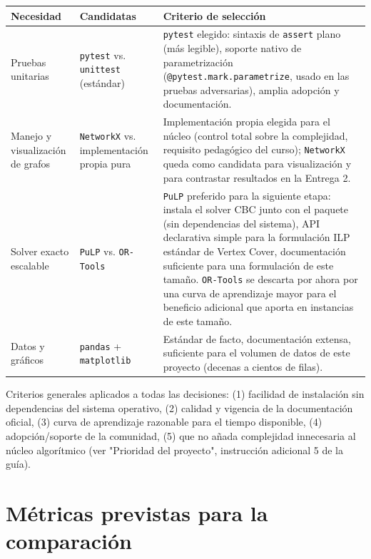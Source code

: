\documentclass[11pt,a4paper]{article}
\begin{document}
\begin{center}
\begin{tabular}{p{2.9cm}p{4.8cm}p{6.5cm}}
	\toprule
	\textbf{Necesidad} & \textbf{Candidatas} & \textbf{Criterio de selección} \\
	\midrule
	Pruebas unitarias &
		\texttt{pytest} vs. \texttt{unittest} (estándar) &
		\texttt{pytest} elegido: sintaxis de \texttt{assert} plano (más legible), soporte
		nativo de parametrización (\texttt{@pytest.mark.parametrize}, usado en las pruebas
		adversarias), amplia adopción y documentación. \\
	Manejo y visualización de grafos &
		\texttt{NetworkX} vs. implementación propia pura &
		Implementación propia elegida para el núcleo (control total sobre la complejidad,
		requisito pedagógico del curso); \texttt{NetworkX} queda como candidata para
		visualización y para contrastar resultados en la Entrega 2. \\
	Solver exacto escalable &
		\texttt{PuLP} vs. \texttt{OR-Tools} &
		\texttt{PuLP} preferido para la siguiente etapa: instala el solver CBC junto con el
		paquete (sin dependencias del sistema), API declarativa simple para la formulación
		ILP estándar de Vertex Cover, documentación suficiente para una formulación de este
		tamaño. \texttt{OR-Tools} se descarta por ahora por una curva de aprendizaje mayor
		para el beneficio adicional que aporta en instancias de este tamaño. \\
	Datos y gráficos &
		\texttt{pandas} + \texttt{matplotlib} &
		Estándar de facto, documentación extensa, suficiente para el volumen de datos de
		este proyecto (decenas a cientos de filas). \\
	\bottomrule
\end{tabular}
\end{center}

Criterios generales aplicados a todas las decisiones: (1) facilidad de instalación sin
dependencias del sistema operativo, (2) calidad y vigencia de la documentación oficial,
(3) curva de aprendizaje razonable para el tiempo disponible, (4) adopción/soporte de la
comunidad, (5) que no añada complejidad innecesaria al núcleo algorítmico (ver "Prioridad
del proyecto", instrucción adicional 5 de la guía).

\section{Métricas previstas para la comparación}
\end{document}
